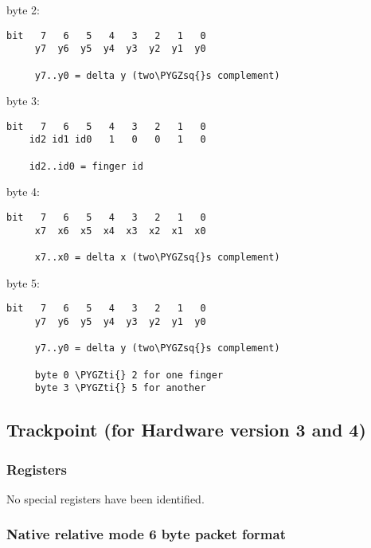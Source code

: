 \documentclass[a4paper,8pt,english]{sphinxmanual}
\def\PYGZsq{\char`\'}
\def\PYGZti{\char`\~}
\renewcommand\PYGZsq{\textquotesingle}
\begin{document}
byte 2:

\begin{Verbatim}[commandchars=\\\{\}]
bit   7   6   5   4   3   2   1   0
     y7  y6  y5  y4  y3  y2  y1  y0

     y7..y0 = delta y (two\PYGZsq{}s complement)
\end{Verbatim}

byte 3:

\begin{Verbatim}[commandchars=\\\{\}]
bit   7   6   5   4   3   2   1   0
    id2 id1 id0   1   0   0   1   0

    id2..id0 = finger id
\end{Verbatim}

byte 4:

\begin{Verbatim}[commandchars=\\\{\}]
bit   7   6   5   4   3   2   1   0
     x7  x6  x5  x4  x3  x2  x1  x0

     x7..x0 = delta x (two\PYGZsq{}s complement)
\end{Verbatim}

byte 5:

\begin{Verbatim}[commandchars=\\\{\}]
bit   7   6   5   4   3   2   1   0
     y7  y6  y5  y4  y3  y2  y1  y0

     y7..y0 = delta y (two\PYGZsq{}s complement)

     byte 0 \PYGZti{} 2 for one finger
     byte 3 \PYGZti{} 5 for another
\end{Verbatim}


\subsection{Trackpoint (for Hardware version 3 and 4)}
\label{input/devices/elantech:trackpoint-for-hardware-version-3-and-4}

\subsubsection{Registers}
\label{input/devices/elantech:id8}
No special registers have been identified.


\subsubsection{Native relative mode 6 byte packet format}
\label{input/devices/elantech:native-relative-mode-6-byte-packet-format}
\end{document}
